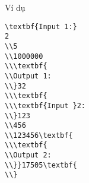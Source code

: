 Ví dụ
\begin{verbatim}
\textbf{Input 1:}
2
\\5
\\1000000
\\\textbf{
\\Output 1:
\\}32
\\\textbf{
\\\textbf{Input }2:
\\}123
\\456
\\123456\textbf{
\\\textbf{
\\Output 2:
\\}}17505\textbf{
\\}\end{verbatim}